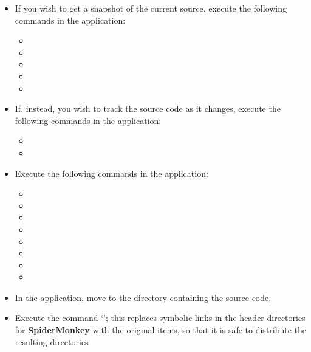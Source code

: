\begin{itemize}
\item If you wish to get a snapshot of the current source, execute the following
commands in the  application:
\begin{itemize}
\item {}
\item\exSp{}
\item\exSp{}
\item\exSp{}
\item\exSp{}
\end{itemize}
\item\exSp{}If, instead, you wish to track the source code as it changes, execute the
following commands in the  application:
\begin{itemize}
\item {}
\item\exSp{}
\end{itemize}
\item\exSp{}Execute the following commands in the  application:
\begin{itemize}
\item\exSp{}
\item\exSp{}
\item\exSp{}
\item\exSp{}
\item\exSp{}
\item\exSp{}
\item\exSp{}
\item\exSp{}
\end{itemize}
\item\exSp{}In the  application, move to the directory containing the
\mplusm{} source code, 
\item\exSp{}Execute the command `'; this replaces symbolic links in the
header directories for \textbf{SpiderMonkey} with the original items, so that it is safe
to distribute the resulting directories
\end{itemize}
